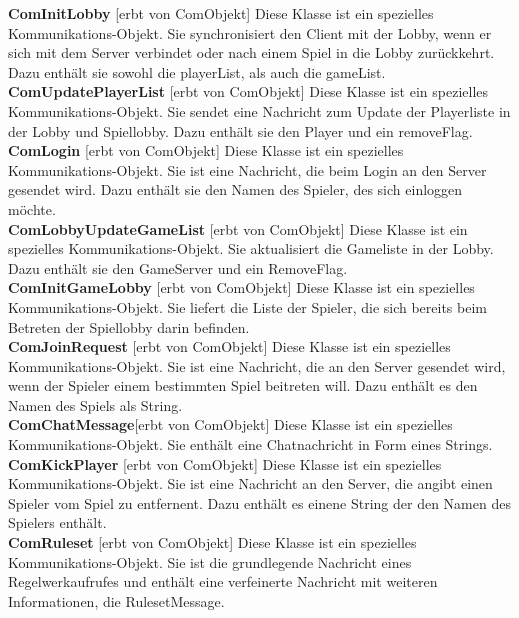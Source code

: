 \documentclass{article}
\begin{document}
\textbf{ComInitLobby} [erbt von ComObjekt] Diese Klasse ist ein spezielles Kommunikations-Objekt. Sie synchronisiert den Client mit der Lobby, wenn er sich mit dem Server verbindet oder nach einem Spiel in die Lobby zurückkehrt. Dazu enthält sie sowohl die playerList, als auch die gameList.\\

\textbf{ComUpdatePlayerList} [erbt von ComObjekt] Diese Klasse ist ein spezielles Kommunikations-Objekt. Sie sendet eine Nachricht zum Update der Playerliste in der Lobby und Spiellobby. Dazu enthält sie den Player und ein removeFlag.\\
		
\textbf{ComLogin} [erbt von ComObjekt] Diese Klasse ist ein spezielles Kommunikations-Objekt. Sie ist eine Nachricht, die beim Login an den Server gesendet wird. Dazu enthält sie den Namen des Spieler, des sich einloggen möchte.\\
		
\textbf{ComLobbyUpdateGameList} [erbt von ComObjekt] Diese Klasse ist ein spezielles Kommunikations-Objekt. Sie aktualisiert die Gameliste in der Lobby. Dazu enthält sie den GameServer und ein RemoveFlag.\\
		
\textbf{ComInitGameLobby} [erbt von ComObjekt] Diese Klasse ist ein spezielles Kommunikations-Objekt. Sie liefert die Liste der Spieler, die sich bereits beim Betreten der Spiellobby darin befinden. \\

\textbf{ComJoinRequest} [erbt von ComObjekt] Diese Klasse ist ein spezielles Kommunikations-Objekt. Sie ist eine Nachricht, die an den Server gesendet wird, wenn der Spieler einem bestimmten Spiel beitreten will. Dazu enthält es den Namen des Spiels als String. \\
		
\textbf{ComChatMessage}[erbt von ComObjekt] Diese Klasse ist ein spezielles Kommunikations-Objekt. Sie enthält eine Chatnachricht in Form eines Strings.\\

\textbf{ComKickPlayer} [erbt von ComObjekt] Diese Klasse ist ein spezielles Kommunikations-Objekt. Sie ist eine Nachricht an den Server, die angibt einen Spieler vom Spiel zu entfernent. Dazu enthält es einene String der den Namen des Spielers enthält. \\
		
\textbf{ComRuleset} [erbt von ComObjekt] Diese Klasse ist ein spezielles Kommunikations-Objekt. Sie ist die grundlegende Nachricht eines Regelwerkaufrufes und enthält eine verfeinerte Nachricht mit weiteren Informationen, die RulesetMessage. \\
		
\end{document}

